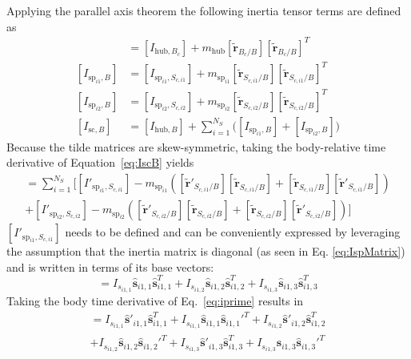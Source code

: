 \documentclass[paper]{aiaaNew}
\begin{document}
	Applying the parallel axis theorem the following inertia tensor terms are defined as
	\begin{align}
	[I_{\text{hub},B}] &= [I_{\text{hub},B_c}] + m_{\text{hub}}[\bm{\tilde{r}}_{B_c/B}] [\bm{\tilde{r}}_{B_c/B}]^T
	\label{eq:IHubB}
	\\
	[I_{\text{sp}_{i1},B}] &= [I_{\text{sp}_{i1},S_{c,i1}}] + m_{\text{sp}_{i1}}[\bm{\tilde{r}}_{S_{c,i1}/B}] [\bm{\tilde{r}}_{S_{c,{i1}}/B}]^T
	\\
	[I_{\text{sp}_{i2},B}] &= [I_{\text{sp}_{i2},S_{c,i2}}] + m_{\text{sp}_{i2}}[\bm{\tilde{r}}_{S_{c,i2}/B}] [\bm{\tilde{r}}_{S_{c,{i2}}/B}]^T
	\\
	[I_{\text{sc},B}] &= [I_{\text{hub},B}] + \sum\limits_{i=1}^{N_S}\Big( [I_{\text{sp}_{i1},B}] + [I_{\text{sp}_{i2},B}]\Big)
	\label{eq:IscB}
	\end{align}
	Because the tilde matrices are skew-symmetric, taking the body-relative time derivative of Equation~\eqref{eq:IscB} yields
	\begin{multline}
		[I'_{\text{sc},B}] = \sum\limits_{i=1}^{N_S} \Big[[I'_{\text{sp}_{i1},S_{c,i1}}] - m_{\text{sp}_{i1}}\left([\bm{\tilde{r}}'_{S_{c,{i1}}/B}] [\bm{\tilde{r}}_{S_{c,{i1}}/B}] + [\bm{\tilde{r}}_{S_{c,{i1}}/B}] [\bm{\tilde{r}}'_{S_{c,{i1}}/B}]\right)\\
		+[I'_{\text{sp}_{i2},S_{c,i2}}] - m_{\text{sp}_{i2}}\left([\bm{\tilde{r}}'_{S_{c,{i2}}/B}] [\bm{\tilde{r}}_{S_{c,{i2}}/B}] + [\bm{\tilde{r}}_{S_{c,{i2}}/B}] [\bm{\tilde{r}}'_{S_{c,{i2}}/B}]\right)\Big]
		\label{eq:IprimeScB}
	\end{multline}
	$[I'_{\text{sp}_{i1},S_{c,i1}}]$ needs to be defined and can be conveniently expressed by leveraging the assumption that the inertia matrix is diagonal (as seen in Eq. \eqref{eq:IspMatrix}) and is written in terms of its base vectors:
	\begin{equation}
	[I_{\text{sp}_{i1},S_{c,i1}}] = I_{s_{i1,1}}\hat{\bm s}_{i1,1}\hat{\bm s}_{i1,1}^{T}+I_{s_{i1,2}}\hat{\bm s}_{i1,2}\hat{\bm s}_{i1,2}^{T}+I_{s_{i1,3}}\hat{\bm s}_{i1,3}\hat{\bm s}_{i1,3}^{T}
	\label{eq:iprime}
	\end{equation}
	Taking the body time derivative of Eq.~\eqref{eq:iprime} results in
	\begin{multline}
	[I'_{\text{sp}_{i1},S_{c,i1}}] = I_{s_{i1,1}}\hat{\bm s}'_{i1,1}\hat{\bm s}_{i1,1}^{T}+I_{s_{i1,1}}\hat{\bm s}_{i1,1}\hat{\bm s}_{i1,1}'^{T}+I_{s_{i1,2}}\hat{\bm s}'_{i1,2}\hat{\bm s}_{i1,2}^{T}\\
	+I_{s_{i1,2}}\hat{\bm s}_{i1,2}\hat{\bm s}_{i1,2}'^{T}+I_{s_{i1,3}}\hat{\bm s}'_{i1,3}\hat{\bm s}_{i1,3}^{T}+I_{s_{i1,3}}\hat{\bm s}_{i1,3}\hat{\bm s}_{i1,3}'^{T}
	\label{eq:iprime2}
	\end{multline}
\end{document}
